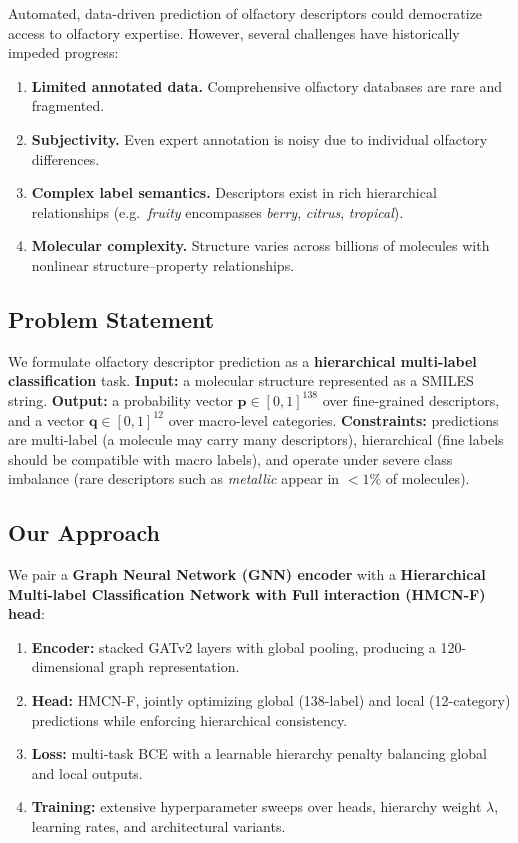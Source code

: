 \documentclass[10pt,twocolumn]{article}
\begin{document}
\noindent Automated, data-driven prediction of olfactory descriptors could democratize access to olfactory expertise. However, several challenges have historically impeded progress:

\begin{enumerate}[leftmargin=1.4em,itemsep=2pt]
  \item \textbf{Limited annotated data.} Comprehensive olfactory databases are rare and fragmented.
  \item \textbf{Subjectivity.} Even expert annotation is noisy due to individual olfactory differences.
  \item \textbf{Complex label semantics.} Descriptors exist in rich hierarchical relationships (e.g.\ \emph{fruity} encompasses \emph{berry}, \emph{citrus}, \emph{tropical}).
  \item \textbf{Molecular complexity.} Structure varies across billions of molecules with nonlinear structure--property relationships.
\end{enumerate}

\subsection{Problem Statement}
We formulate olfactory descriptor prediction as a \textbf{hierarchical multi-label classification} task.
\textbf{Input:} a molecular structure represented as a SMILES string.
\textbf{Output:} a probability vector $\mathbf{p}\in[0,1]^{138}$ over fine-grained descriptors, and a vector $\mathbf{q}\in[0,1]^{12}$ over macro-level categories.
\textbf{Constraints:} predictions are multi-label (a molecule may carry many descriptors), hierarchical (fine labels should be compatible with macro labels), and operate under severe class imbalance (rare descriptors such as \emph{metallic} appear in $<1\%$ of molecules).

\subsection{Our Approach}
We pair a \textbf{Graph Neural Network (GNN) encoder} with a \textbf{Hierarchical Multi-label Classification Network with Full interaction (HMCN-F) head}:
\begin{enumerate}[leftmargin=1.4em,itemsep=2pt]
  \item \textbf{Encoder:} stacked GATv2 layers with global pooling, producing a 120-dimensional graph representation.
  \item \textbf{Head:} HMCN-F, jointly optimizing global (138-label) and local (12-category) predictions while enforcing hierarchical consistency.
  \item \textbf{Loss:} multi-task BCE with a learnable hierarchy penalty balancing global and local outputs.
  \item \textbf{Training:} extensive hyperparameter sweeps over heads, hierarchy weight $\lambda$, learning rates, and architectural variants.
\end{enumerate}
\end{document}
